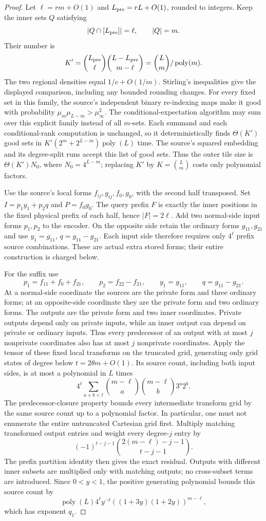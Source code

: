 \documentclass[11pt]{article}
\begin{document}
\begin{proof}
Let $\ell=rm+O(1)$ and $L_{\rm pre}=rL+O(1)$, rounded to integers.
Keep the inner sets $Q$ satisfying
\[
 |Q\cap[L_{\rm pre}]|=\ell,\qquad |Q|=m.
\]
Their number is
\[
 K'=\binom{L_{\rm pre}}\ell\binom{L-L_{\rm pre}}{m-\ell}
     =\binom Lm/\operatorname{poly}(m).
\]
The two regional densities equal $1/c+O(1/m)$. Stirling's inequalities
give the displayed comparison, including any bounded rounding changes.
For every fixed set in this family, the source's independent binary
re-indexing maps make it good with probability
$\mu_m\mu_{L-m}>\mu_\infty^2$. The conditional-expectation algorithm
may sum over this explicit family instead of all $m$-sets. Each summand
and each conditional-rank computation is unchanged, so it deterministically
finds $\Theta(K')$ good sets in
$K'(2^m+2^{L-m})\operatorname{poly}(L)$ time. The source's squared
embedding and its degree-split runs accept this list of good sets.
Thus the outer tile size is $\Theta(K')N_0$, where $N_0=4^{L-m}$;
replacing $K'$ by $K=\binom Lm$ costs only polynomial factors.

Use the source's local forms $f_{ij},g_{ij},f_0,g_0$, with the second
half transposed. Set $I=p_1y_1+p_2q$ and $P=f_0g_0$.
The query prefix $F$ is exactly the inner positions in the fixed physical
prefix of each half, hence $|F|=2\ell$. Add two normal-side input forms
$p_1,p_2$ to the encoder. On the opposite side retain the ordinary forms
$g_{11},g_{21}$ and use $y_1=g_{11}$, $q=g_{11}-g_{21}$.
Each input side therefore requires only $4^\ell$ prefix source
combinations. These are actual extra
stored forms; their entire construction is charged below.

For the suffix use
\[
 p_1=f_{11}+f_0+f_{21},\qquad p_2=f_{22}-f_{21},
 \qquad y_1=g_{11},\qquad q=g_{11}-g_{21}.
\]
At a normal-side coordinate the sources are the private form and three
ordinary forms; at an opposite-side coordinate they are the private form
and two ordinary forms. The outputs are the private form and two inner
coordinates. Private outputs depend only on private inputs, while an inner
output can depend on private or ordinary inputs. Thus every predecessor
of an output with at most $j$ nonprivate coordinates also has at most $j$
nonprivate coordinates. Apply the tensor of these fixed local transforms
on the truncated grid, generating only grid states of degree below
$t=2\theta m+O(1)$. Its source count, including both input sides, is
at most a polynomial in $L$ times
\[
 4^\ell\sum_{a+b<t}\binom{m-\ell}a\binom{m-\ell}b3^a2^b.
\]
The predecessor-closure property bounds every intermediate transform
grid by the same source count up to a polynomial factor. In particular,
one must not enumerate the entire untruncated Cartesian grid first.
Multiply matching transformed output entries and weight every degree-$j$
entry by
\[
 (-1)^{t-j-1}\binom{2(m-\ell)-j-1}{t-j-1}.
\]
The prefix partition identity then gives the exact residual. Outputs
with different inner subsets are multiplied only with matching outputs;
no cross-subset terms are introduced. Since $0<y<1$, the positive
generating polynomial bounds this source count by
\[
 \operatorname{poly}(L)4^\ell y^{-t}
       ((1+3y)(1+2y))^{m-\ell},
\]
which has exponent $q_1$.


\end{proof}
\end{document}
